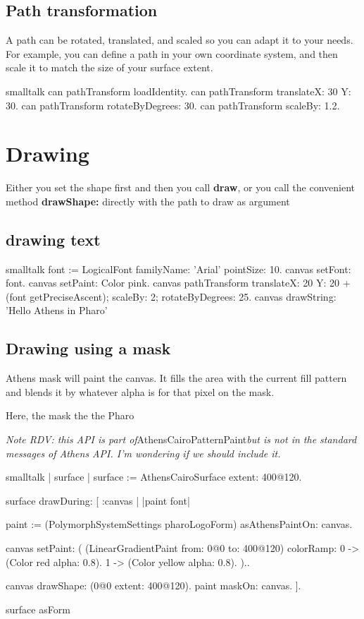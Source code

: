 \documentclass[10pt,twoside,english]{_support/latex/sbabook/sbabook}
\begin{document}
\subsection{Path transformation}
A path can be rotated, translated, and scaled so you can adapt it to your needs.
For example, you can define a path in your own coordinate system, and then
scale it to match the size of your surface extent.
\begin{displaycode}{smalltalk}
can pathTransform loadIdentity.
can pathTransform translateX: 30 Y: 30.
can pathTransform rotateByDegrees: 30.
can pathTransform scaleBy: 1.2.
\end{displaycode}

\section{Drawing}
Either you set the shape first and then you call \textbf{draw}, or you call the
convenient method \textbf{drawShape:} directly with the path to draw as argument

\subsection{drawing text}\begin{displaycode}{smalltalk}
font := LogicalFont familyName: 'Arial' pointSize: 10.
canvas setFont: font.
canvas setPaint: Color pink.
canvas pathTransform translateX: 20 Y: 20 + (font getPreciseAscent); scaleBy: 2; rotateByDegrees: 25.
canvas drawString: 'Hello Athens in Pharo'
\end{displaycode}

\subsection{Drawing using a mask}
Athens mask will paint the canvas. It fills the area with the current fill pattern and blends it by whatever alpha is for that pixel on the mask.

Here, the mask the the Pharo

\textit{Note RDV: this API is part of}AthensCairoPatternPaint\textit{but is not in the standard messages of Athens API. I'm wondering if we should include it.}
\begin{displaycode}{smalltalk}
| surface |
surface := AthensCairoSurface   extent: 400@120.

surface drawDuring: [ :canvas | |paint font|

paint := (PolymorphSystemSettings pharoLogoForm) asAthensPaintOn: canvas.

canvas setPaint: (
 (LinearGradientPaint from: 0@0  to: 400@120)
 colorRamp: {  
  0 -> (Color red alpha: 0.8).
  1 -> (Color yellow alpha: 0.8).
 })..


canvas drawShape: (0@0 extent: 400@120).
paint maskOn: canvas.
].

surface asForm
\end{displaycode}
\end{document}
